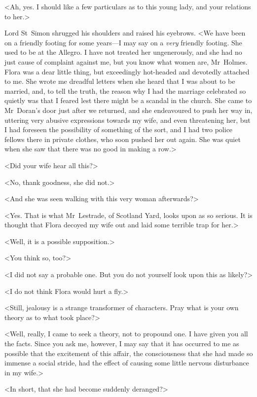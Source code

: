 <Ah, yes. I should like a few particulars as to this young lady, and your relations to her.>

Lord St~Simon shrugged his shoulders and raised his eyebrows. <We have been on a friendly footing for some years—I may say on a \textit{very} friendly footing. She used to be at the Allegro. I have not treated her ungenerously, and she had no just cause of complaint against me, but you know what women are, Mr~Holmes. Flora was a dear little thing, but exceedingly hot-headed and devotedly attached to me. She wrote me dreadful letters when she heard that I was about to be married, and, to tell the truth, the reason why I had the marriage celebrated so quietly was that I feared lest there might be a scandal in the church. She came to Mr~Doran's door just after we returned, and she endeavoured to push her way in, uttering very abusive expressions towards my wife, and even threatening her, but I had foreseen the possibility of something of the sort, and I had two police fellows there in private clothes, who soon pushed her out again. She was quiet when she saw that there was no good in making a row.>

<Did your wife hear all this?>

<No, thank goodness, she did not.>

<And she was seen walking with this very woman afterwards?>

<Yes. That is what Mr~Lestrade, of Scotland Yard, looks upon as so serious. It is thought that Flora decoyed my wife out and laid some terrible trap for her.>

<Well, it is a possible supposition.>

<You think so, too?>

<I did not say a probable one. But you do not yourself look upon this as likely?>

<I do not think Flora would hurt a fly.>

<Still, jealousy is a strange transformer of characters. Pray what is your own theory as to what took place?>

<Well, really, I came to seek a theory, not to propound one. I have given you all the facts. Since you ask me, however, I may say that it has occurred to me as possible that the excitement of this affair, the consciousness that she had made so immense a social stride, had the effect of causing some little nervous disturbance in my wife.>

<In short, that she had become suddenly deranged?>

